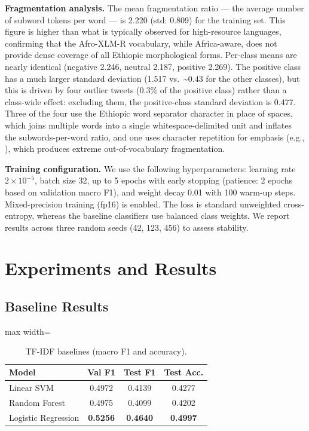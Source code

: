 \textbf{Fragmentation analysis.} The mean fragmentation ratio --- the average number of subword tokens per word --- is 2.220 (std: 0.809) for the training set. This figure is higher than what is typically observed for high-resource languages, confirming that the Afro-XLM-R vocabulary, while Africa-aware, does not provide dense coverage of all Ethiopic morphological forms. Per-class means are nearly identical (negative 2.246, neutral 2.187, positive 2.269). The positive class has a much larger standard deviation (1.517 vs.~\textasciitilde0.43 for the other classes), but this is driven by four outlier tweets (0.3\% of the positive class) rather than a class-wide effect: excluding them, the positive-class standard deviation is 0.477. Three of the four use the Ethiopic word separator character  in place of spaces, which joins multiple words into a single whitespace-delimited unit and inflates the subwords-per-word ratio, and one uses character repetition for emphasis (e.g., ), which produces extreme out-of-vocabulary fragmentation.

\textbf{Training configuration.} We use the following hyperparameters: learning rate $2\times10^{-5}$, batch size 32, up to 5 epochs with early stopping (patience: 2 epochs based on validation macro F1), and weight decay 0.01 with 100 warm-up steps. Mixed-precision training (fp16) is enabled. The loss is standard unweighted cross-entropy, whereas the baseline classifiers use balanced class weights. We report results across three random seeds (42, 123, 456) to assess stability.


\section{Experiments and Results}

\subsection{Baseline Results}

\begin{table}[t]
\centering\small
\begin{adjustbox}{max width=\linewidth}
\begin{tabular}{lccc}
\toprule
Model & Val F1 & Test F1 & Test Acc. \\
\midrule
Linear SVM & 0.4972 & 0.4139 & 0.4277 \\
Random Forest & 0.4975 & 0.4099 & 0.4202 \\
Logistic Regression & \textbf{0.5256} & \textbf{0.4640} & \textbf{0.4997} \\
\bottomrule
\end{tabular}
\end{adjustbox}
\caption{TF-IDF baselines (macro F1 and accuracy).}
\label{tab:baselines}
\end{table}

